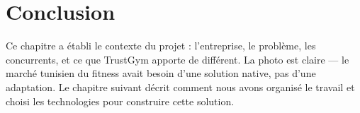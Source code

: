 \documentclass[../main.tex]{subfiles}
\begin{document}
\section{Conclusion}
Ce chapitre a \'{e}tabli le contexte du projet : l'entreprise, le probl\`{e}me, les concurrents, et ce que TrustGym apporte de diff\'{e}rent. La photo est claire --- le march\'{e} tunisien du fitness avait besoin d'une solution native, pas d'une adaptation. Le chapitre suivant d\'{e}crit comment nous avons organis\'{e} le travail et choisi les technologies pour construire cette solution.
\end{document}
